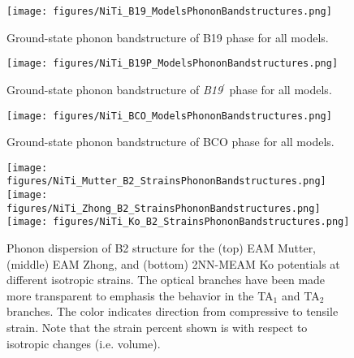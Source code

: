\documentclass[preprint]{elsarticle}
\begin{document}
\begin{figure}[!htp]
    \begin{centering}
        \texttt{[image: figures/NiTi\_B19\_ModelsPhononBandstructures.png]}
        \caption{
          Ground-state phonon bandstructure of B19 phase for all models.
        }
        \label{fig:allmodels_B19P}
    \end{centering}
\end{figure}

\begin{figure}[!htp]
    \begin{centering}
        \texttt{[image: figures/NiTi\_B19P\_ModelsPhononBandstructures.png]}
        \caption{
          Ground-state phonon bandstructure of \textit{B19}$^\prime$ phase for all models.
        }
        \label{fig:allmodels_B19P}
    \end{centering}
\end{figure}


\begin{figure}[!htp]
    \begin{centering}
        \texttt{[image: figures/NiTi\_BCO\_ModelsPhononBandstructures.png]}
        \caption{
          Ground-state phonon bandstructure of BCO phase for all models.
        }
        \label{fig:allmodels_B19P}
    \end{centering}
\end{figure}

\begin{figure}[!htp]
    \begin{centering}
        \texttt{[image: figures/NiTi\_Mutter\_B2\_StrainsPhononBandstructures.png]}
        \vspace{1mm}
        \texttt{[image: figures/NiTi\_Zhong\_B2\_StrainsPhononBandstructures.png]}
        \vspace{1mm}
        \texttt{[image: figures/NiTi\_Ko\_B2\_StrainsPhononBandstructures.png]}
        \caption{
           Phonon dispersion of B2 structure for the  (top) EAM Mutter, (middle) EAM Zhong, and (bottom) 2NN-MEAM Ko potentials at different isotropic strains. The optical branches have been made more transparent to emphasis the behavior in the TA$_1$ and TA$_2$ branches. The color indicates direction from compressive to tensile strain. Note that the strain percent shown is with respect to isotropic changes (i.e. volume). 
        }
        \label{fig:mutter_zhong_phonon_b2}
    \end{centering}
\end{figure}
\end{document}
